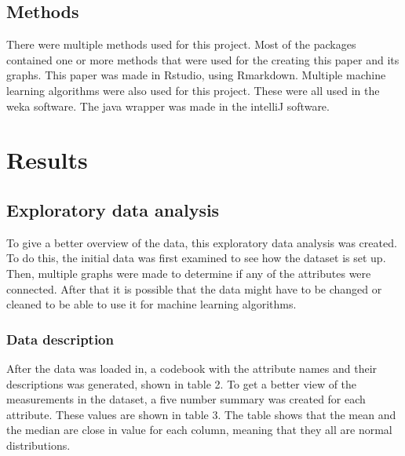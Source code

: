 \documentclass[
]{article}
\begin{document}
\hypertarget{methods}{%
\subsection{Methods}\label{methods}}

There were multiple methods used for this project. Most of the packages
contained one or more methods that were used for the creating this paper
and its graphs. This paper was made in Rstudio, using Rmarkdown.
Multiple machine learning algorithms were also used for this project.
These were all used in the weka software. The java wrapper was made in
the intelliJ software.

\newpage

\hypertarget{results}{%
\section{Results}\label{results}}

\hypertarget{exploratory-data-analysis}{%
\subsection{Exploratory data analysis}\label{exploratory-data-analysis}}

To give a better overview of the data, this exploratory data analysis
was created. To do this, the initial data was first examined to see how
the dataset is set up. Then, multiple graphs were made to determine if
any of the attributes were connected. After that it is possible that the
data might have to be changed or cleaned to be able to use it for
machine learning algorithms.

\hypertarget{data-description}{%
\subsubsection{Data description}\label{data-description}}

After the data was loaded in, a codebook with the attribute names and
their descriptions was generated, shown in table 2. To get a better view
of the measurements in the dataset, a five number summary was created
for each attribute. These values are shown in table 3. The table shows
that the mean and the median are close in value for each column, meaning
that they all are normal distributions.
\end{document}
